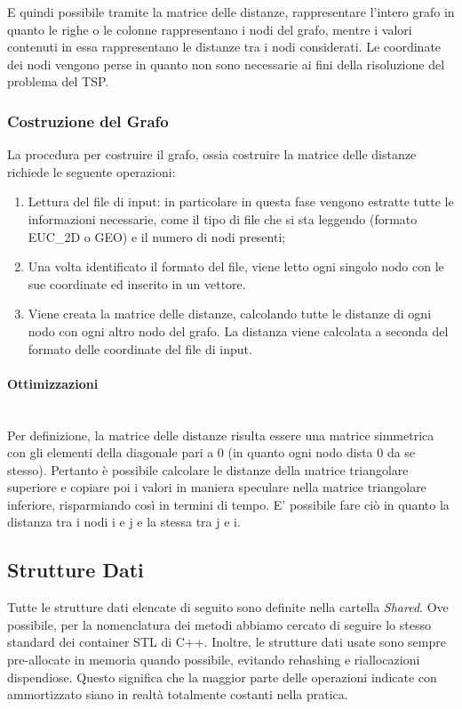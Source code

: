 E quindi possibile tramite la matrice delle distanze, rappresentare l'intero grafo in quanto le righe o le colonne rappresentano i nodi del grafo, mentre i valori contenuti in essa rappresentano le distanze tra i nodi considerati. Le coordinate dei nodi vengono perse in quanto non sono necessarie ai fini della risoluzione del problema del TSP.


\subsubsection {Costruzione del Grafo}
La procedura per costruire il grafo, ossia costruire la matrice delle distanze richiede le seguente operazioni:
\begin{enumerate}
    \item Lettura del file di input: in particolare in questa fase vengono estratte tutte le informazioni necessarie, come il tipo di file che si sta leggendo (formato EUC\_2D o GEO) e il numero di nodi presenti; 
    \item Una volta identificato il formato del file, viene letto ogni singolo nodo con le sue coordinate ed inserito in un vettore.
    \item Viene creata la matrice delle distanze, calcolando tutte le distanze di ogni nodo con ogni altro nodo del grafo. La distanza viene calcolata a seconda del formato delle coordinate del file di input.
\end{enumerate}

\paragraph{Ottimizzazioni}\mbox{} \\
\noindent Per definizione, la matrice delle distanze risulta essere una matrice simmetrica con gli elementi della diagonale pari a 0 (in quanto ogni nodo dista 0 da se stesso). Pertanto è possibile calcolare le distanze della matrice triangolare superiore e copiare poi i valori in maniera speculare nella matrice triangolare inferiore, risparmiando così in termini di tempo. E' possibile fare ciò in quanto la distanza tra i nodi i e j e la stessa tra j e i.\\


\subsection{Strutture Dati}

Tutte le strutture dati elencate di seguito sono definite nella cartella \textit{Shared}.
Ove possibile, per la nomenclatura dei metodi abbiamo cercato di seguire lo stesso standard dei container STL di C++.
Inoltre, le strutture dati usate sono sempre pre-allocate in memoria quando possibile, evitando rehashing e riallocazioni dispendiose. Questo significa che la maggior parte delle operazioni indicate con \complexityConstant{} ammortizzato siano in realtà totalmente costanti nella pratica.


